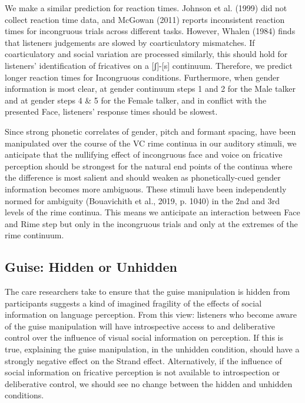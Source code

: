 \documentclass[
  letterpaper,
  DIV=11,
  numbers=noendperiod]{scrartcl}
\begin{document}
We make a similar prediction for reaction times. Johnson et al. (1999)
did not collect reaction time data, and McGowan (2011) reports
inconsistent reaction times for incongruous trials across different
tasks. However, Whalen (1984) finds that listeners judgements are slowed
by coarticulatory mismatches. If coarticulatory and social variation are
processed similarly, this should hold for listeners' identification of
fricatives on a {[}ʃ{]}-{[}s{]} continuum. Therefore, we predict longer
reaction times for Incongruous conditions. Furthermore, when gender
information is most clear, at gender continuum steps 1 and 2 for the
Male talker and at gender steps 4 \& 5 for the Female talker, and in
conflict with the presented Face, listeners' response times should be
slowest.

Since strong phonetic correlates of gender, pitch and formant spacing,
have been manipulated over the course of the VC rime continua in our
auditory stimuli, we anticipate that the nullifying effect of
incongruous face and voice on fricative perception should be strongest
for the natural end points of the continua where the difference is most
salient and should weaken as phonetically-cued gender information
becomes more ambiguous. These stimuli have been independently normed for
ambiguity (Bouavichith et al., 2019, p. 1040) in the 2nd and 3rd levels
of the rime continua. This means we anticipate an interaction between
Face and Rime step but only in the incongruous trials and only at the
extremes of the rime continuum.

\subsection{Guise: Hidden or Unhidden}\label{sec-pred-guise}

The care researchers take to ensure that the guise manipulation is
hidden from participants suggests a kind of imagined fragility of the
effects of social information on language perception. From this view:
listeners who become aware of the guise manipulation will have
introspective access to and deliberative control over the influence of
visual social information on perception. If this is true, explaining the
guise manipulation, in the unhidden condition, should have a strongly
negative effect on the Strand effect. Alternatively, if the influence of
social information on fricative perception is not available to
introspection or deliberative control, we should see no change between
the hidden and unhidden conditions.
\end{document}
